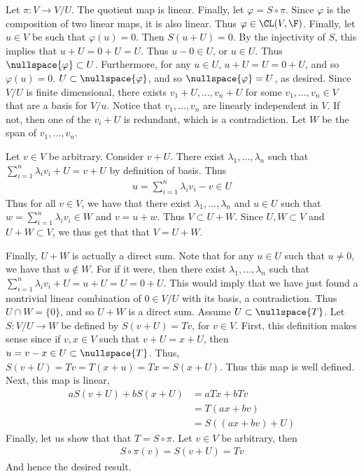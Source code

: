 \documentclass{book}
\begin{document}
\begin{enumerate}[label=\arabic*)]
      Let $\pi: V \to V/U$. The quotient map is linear. Finally, let $\varphi = S \circ \pi$. Since $\varphi$ is the composition of two linear maps, it is also linear. Thus $\varphi \in
      \CL(V, \F)$. Finally, let $u \in V$ be such that $\varphi(u) = 0$. Then $S(u + U) = 0$. By the injectivity of $S$, this implies that $u + U = 0 + U = U$. Thus $u - 0 \in U$, or $u \in
      U$. Thus $\nullspace{\varphi} \subset U$. Furthermore, for any $u \in U$, $u + U = U = 0 + U$, and so $\varphi(u) = 0$. $U \subset \nullspace{\varphi}$, and so $\nullspace{\varphi} =
      U$, as desired.
    \ii
      Since $V/U$ is finite dimensional, there exists $v_1 + U, \dots, v_n + U$ for some $v_1, \dots, v_n \in V$ that are a basis for $V/u$. Notice that $v_1, \dots, v_n$ are linearly
      independent in $V$. If not, then one of the $v_i + U$ is redundant, which is a contradiction. Let $W$ be the span of $v_1, \dots, v_n$.

      Let $v \in V$ be arbitrary. Consider $v + U$.  There exist $\lambda_1, \dots, \lambda_n$ such that $\sum_{i = 1}^{n}\lambda_iv_i + U = v + U$ by definition of basis. Thus 
      \begin{align*}
        u = \sum_{i = 1}^{n}\lambda_iv_i - v \in U
      \end{align*}
      Thus for all $v \in V$, we have that there exist $\lambda_1, \dots, \lambda_n$ and $u \in U$ such that $w = \sum_{i = 1}^{n}\lambda_iv_i \in W$ and $v = u + w$. Thus $V \subset U + W$.
      Since $U, W \subset V$ and $U + W \subset V$, we thus get that that $V = U + W$. 

      Finally, $U + W$ is actually a direct sum. Note that for any $u \in U$ such that $u \neq 0$, we have that $u \not\in W$. For if it were, then there exist $\lambda_1, \dots, \lambda_n$
      such that $\sum_{i = 1}^{n}\lambda_iv_i + U = u + U = U = 0 + U$. This would imply that we have just found a nontrivial linear combination of $0 \in V/U$ with its basis, a
      contradiction. Thus $U \cap W = \{0\}$, and so $U + W$ is a direct sum.
    \ii
      Assume $U \subset \nullspace{T}$. Let $S: V/U \to W$ be defined by $S(v + U) = Tv$, for $v \in V$. First, this definition makes sense since if $v, x \in V$ such that $v + U = x + U$,
      then $u = v - x \in U \subset \nullspace{T}$. Thus, $S(v + U) = Tv = T(x + u) = Tx = S(x + U)$. Thus this map is well defined. Next, this map is linear,
      \begin{align*}
        aS(v + U) + bS(x + U) & = aTx + bTv \\
        & = T(ax + bv) \\
        & = S\left( (ax + bv) + U \right)
      \end{align*}
      Finally, let us show that that $T = S \circ \pi$. Let $v \in V$ be arbitrary, then
      \begin{align*}
        S\circ\pi(v) = S(v + U) = Tv
      \end{align*}
      And hence the desired result. 


\end{enumerate}
\end{document}
